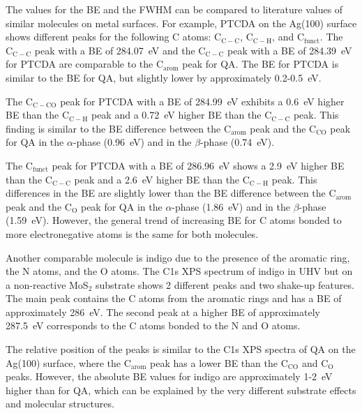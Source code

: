 The values for the \ac{BE} and the \ac{FWHM} can be compared to literature values of similar molecules on metal surfaces. For example, \ac{PTCDA} on the Ag(100) surface shows different peaks for the following C atoms: $\mathrm{C_{C-C}}$, $\mathrm{C_{C-H}}$, and $\mathrm{C_{funct}}$. The $\mathrm{C_{C-C}}$ peak with a \ac{BE} of 284.07~\si{eV} and the $\mathrm{C_{C-C}}$ peak with a \ac{BE} of 284.39~\si{eV} for \ac{PTCDA} are comparable to the $\mathrm{C_{arom}}$ peak for \ac{QA}. The \ac{BE} for \ac{PTCDA} is similar to the \ac{BE} for \ac{QA}, but slightly lower by approximately 0.2-0.5~\si{eV}.\autocite{Bauer2014}

The $\mathrm{C_{C-CO}}$ peak for \ac{PTCDA} with a \ac{BE} of 284.99~\si{eV} exhibits a 0.6~\si{eV} higher \ac{BE} than the $\mathrm{C_{C-H}}$ peak and a 0.72~\si{eV} higher \ac{BE} than the $\mathrm{C_{C-C}}$ peak.\autocite{Bauer2014} This finding is similar to the \ac{BE} difference between the $\mathrm{C_{arom}}$ peak and the $\mathrm{C_{CO}}$ peak for \ac{QA} in the $\alpha$-phase (0.96~\si{eV}) and in the $\beta$-phase (0.74~\si{eV}).

The $\mathrm{C_{funct}}$ peak for \ac{PTCDA} with a \ac{BE} of 286.96~\si{eV} shows a 2.9~\si{eV} higher \ac{BE} than the $\mathrm{C_{C-C}}$ peak and a 2.6~\si{eV} higher \ac{BE} than the $\mathrm{C_{C-H}}$ peak.\autocite{Bauer2014} This differences in the \ac{BE} are slightly lower than the \ac{BE} difference between the $\mathrm{C_{arom}}$ peak and the $\mathrm{C_{O}}$ peak for \ac{QA} in the $\alpha$-phase (1.86~\si{eV}) and in the $\beta$-phase (1.59~\si{eV}).
However, the general trend of increasing \ac{BE} for C atoms bonded to more electronegative atoms is the same for both molecules.

Another comparable molecule is indigo due to the presence of the aromatic ring, the N atoms, and the O atoms. The C1s \ac{XPS} spectrum of indigo in \ac{UHV} but on a non-reactive MoS$_2$ substrate shows 2 different peaks and two shake-up features.\autocite{Michels2021} The main peak contains the C atoms from the aromatic rings and has a \ac{BE} of approximately 286~\si{eV}. The second peak at a higher \ac{BE} of approximately 287.5~\si{eV} corresponds to the C atoms bonded to the N and O atoms.\autocite{Michels2021}

The relative position of the peaks is similar to the C1s \ac{XPS} spectra of \ac{QA} on the Ag(100) surface, where the $\mathrm{C_{arom}}$ peak has a lower \ac{BE} than the $\mathrm{C_{CO}}$ and $\mathrm{C_{O}}$ peaks. However, the absolute \ac{BE} values for indigo are approximately 1-2~\si{eV} higher than for \ac{QA}, which can be explained by the very different substrate effects and molecular structures.


